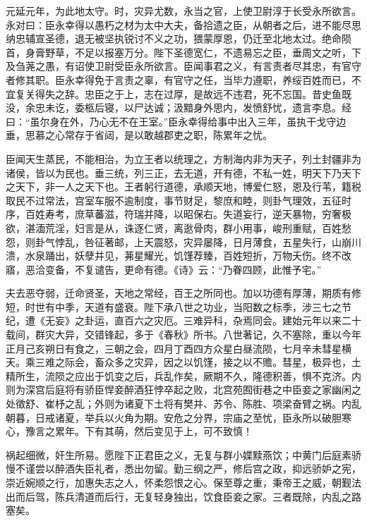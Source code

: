 \documentclass[12pt,UTF8]{ctexbook}
\begin{document}
元延元年，为此地太守。时，灾异尤数，永当之官，上使卫尉淳于长受永所欲言。永对曰：臣永幸得以愚朽之材为太中大夫，备拾遗之臣，从朝者之后，进不能尽思纳忠辅宣圣德，退无被坚执锐讨不义之功，猥蒙厚恩，仍迁至北地太过。绝命陨首，身膏野草，不足以报塞万分。陛下圣德宽仁，不遗易忘之臣，垂周文之听，下及刍荛之愚，有诏使卫尉受臣永所欲言。臣闻事君之义，有言责者尽其忠，有官守者修其职。臣永幸得免于言责之辜，有官守之任，当毕力遵职，养绥百姓而已，不宜复关得失之辞。忠臣之于上，志在过厚，是故远不违君，死不忘国。昔史鱼既没，余忠未讫，委柩后寝，以尸达诚；汲黯身外思内，发愤舒忧，遗言李息。经曰：“虽尔身在外，乃心无不在王室。”臣永幸得给事中出入三年，虽执干戈守边垂，思慕之心常存于省闼，是以敢越郡吏之职，陈累年之忧。



臣闻天生蒸民，不能相治，为立王者以统理之，方制海内非为天子，列土封疆非为诸侯，皆以为民也。垂三统，列三正，去无道，开有德，不私一姓，明天下乃天下之天下，非一人之天下也。王者躬行道德，承顺天地，博爱仁怒，恩及行苇，籍税取民不过常法，宫室车服不逾制度，事节财足，黎庶和睦，则卦气理效，五征时序，百姓寿考，庶草蕃滋，符瑞并降，以昭保右。失道妄行，逆天暴物，穷奢极欲，湛湎荒淫，妇言是从，诛逐仁贤，离逖骨肉，群小用事，峻刑重赋，百姓愁怨，则卦气悖乱，咎征著邮，上天震怒，灾异屡降，日月薄食，五星失行，山崩川溃，水泉踊出，妖孽并见，茀星耀光，饥馑荐臻，百姓短折，万物夭伤。终不改寤，恶洽变备，不复谴告，更命有德。《诗》云：“乃眷四顾，此惟予宅。”



夫去恶夺弱，迁命贤圣，天地之常经，百王之所同也。加以功德有厚薄，期质有修短，时世有中季，天道有盛衰。陛下承八世之功业，当阳数之标季，涉三七之节纪，遭《无妄》之卦运，直百六之灾厄。三难异科，杂焉同会。建始元年以来二十载间，群灾大异，交错锋起，多于《春秋》所书。八世著记，久不塞除，重以今年正月己亥朔日有食之，三朝之会，四月丁酉四方众星白昼流陨，七月辛未彗星横天。乘三难之际会，畜众多之灾异，因之以饥馑，接之以不赡。彗星，极异也，土精所生，流陨之应出于饥变之后，兵乱作矣，厥期不久，隆德积善，惧不克济。内则为深宫后庭将有骄臣悍妾醉酒狂悖卒起之败，北宫苑囿街巷之中臣妾之家幽闲之处徵舒、崔杼之乱；外则为诸夏下土将有樊并、苏令、陈胜、项梁奋臂之祸。内乱朝暮，日戒诸夏，举兵以火角为期。安危之分界，宗庙之至忧，臣永所以破胆寒心，豫言之累年。下有其萌，然后变见于上，可不致慎！



祸起细微，奸生所易。愿陛下正君臣之义，无复与群小媟黩燕饮；中黄门后庭素骄慢不谨尝以醉酒失臣礼者，悉出勿留。勤三纲之严，修后宫之政，抑远骄妒之宪，崇近婉顺之行，加惠失志之人，怀柔怨恨之心。保至尊之重，秉帝王之威，朝觐法出而后驾，陈兵清道而后行，无复轻身独出，饮食臣妾之家。三者既除，内乱之路塞矣。
\end{document}

